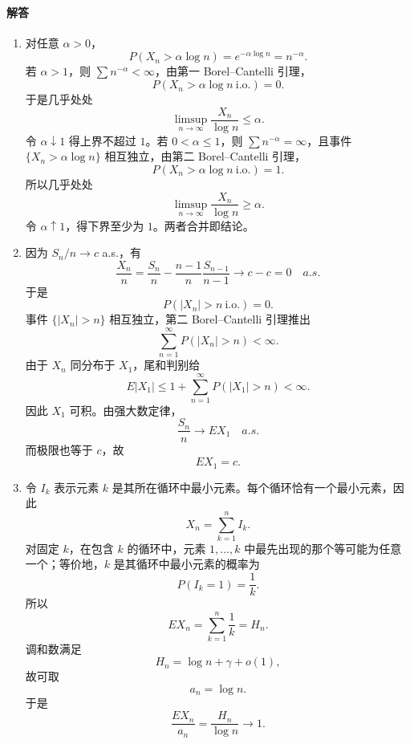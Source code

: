 \documentclass[UTF8,12pt]{ctexart}
\begin{document}
\paragraph{解答}
\begin{enumerate}[label=\textbf{\arabic*.},leftmargin=2.2em]
\item 对任意 \(\alpha>0\)，
\[
P(X_n>\alpha\log n)=e^{-\alpha\log n}=n^{-\alpha}.
\]
若 \(\alpha>1\)，则 \(\sum n^{-\alpha}<\infty\)，由第一 Borel--Cantelli 引理，
\[
P(X_n>\alpha\log n\ \text{i.o.})=0.
\]
于是几乎处处
\[
\limsup_{n\to\infty}\frac{X_n}{\log n}\le\alpha.
\]
令 \(\alpha\downarrow1\) 得上界不超过 \(1\)。若 \(0<\alpha\le1\)，则 \(\sum n^{-\alpha}=\infty\)，且事件 \(\{X_n>\alpha\log n\}\) 相互独立，由第二 Borel--Cantelli 引理，
\[
P(X_n>\alpha\log n\ \text{i.o.})=1.
\]
所以几乎处处
\[
\limsup_{n\to\infty}\frac{X_n}{\log n}\ge\alpha.
\]
令 \(\alpha\uparrow1\)，得下界至少为 \(1\)。两者合并即结论。

\item 因为 \(S_n/n\to c\) a.s.，有
\[
\frac{X_n}{n}=\frac{S_n}{n}-\frac{n-1}{n}\frac{S_{n-1}}{n-1}\to c-c=0
\quad a.s.
\]
于是
\[
P(|X_n|>n\ \text{i.o.})=0.
\]
事件 \(\{|X_n|>n\}\) 相互独立，第二 Borel--Cantelli 引理推出
\[
\sum_{n=1}^\infty P(|X_n|>n)<\infty.
\]
由于 \(X_n\) 同分布于 \(X_1\)，尾和判别给
\[
E|X_1|
\le 1+\sum_{n=1}^\infty P(|X_1|>n)<\infty.
\]
因此 \(X_1\) 可积。由强大数定律，
\[
\frac{S_n}{n}\to E X_1\quad a.s.
\]
而极限也等于 \(c\)，故
\[
E X_1=c.
\]

\item 令 \(I_k\) 表示元素 \(k\) 是其所在循环中最小元素。每个循环恰有一个最小元素，因此
\[
X_n=\sum_{k=1}^n I_k.
\]
对固定 \(k\)，在包含 \(k\) 的循环中，元素 \(1,\ldots,k\) 中最先出现的那个等可能为任意一个；等价地，\(k\) 是其循环中最小元素的概率为
\[
P(I_k=1)=\frac1k.
\]
所以
\[
E X_n=\sum_{k=1}^n\frac1k=H_n.
\]
调和数满足
\[
H_n=\log n+\gamma+o(1),
\]
故可取
\[
a_n=\log n.
\]
于是
\[
\frac{E X_n}{a_n}=\frac{H_n}{\log n}\to1.
\]


\end{enumerate}
\end{document}
